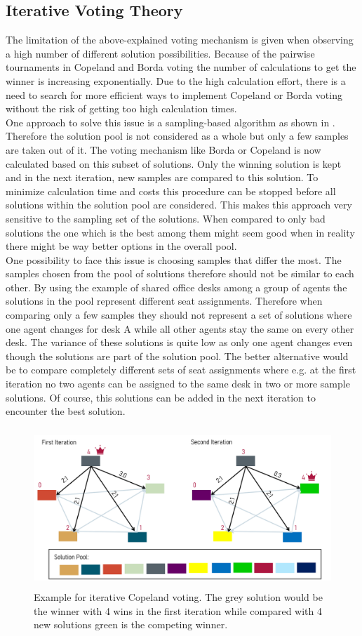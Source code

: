 \documentclass[german, a4paper, 11pt, oneside]{scrbook}
\begin{document}
\subsection{Iterative Voting Theory}
The limitation of the above-explained voting mechanism is given when observing a high number of different solution possibilities. Because of the pairwise tournaments in Copeland and Borda voting the number of calculations to get the winner is increasing exponentially. Due to the high calculation effort, there is a need to search for more efficient ways to implement Copeland or Borda voting without the risk of getting too high calculation times. \cite{Bhavnani.2022b}
\\One approach to solve this issue is a sampling-based algorithm as shown in \cite{Bhavnani.2022b}. Therefore the solution pool is not considered as a whole but only a few samples are taken out of it. The voting mechanism like Borda or Copeland is now calculated based on this subset of solutions. Only the winning solution is kept and in the next iteration, new samples are compared to this solution. To minimize calculation time and costs this procedure can be stopped before all solutions within the solution pool are considered. This makes this approach very sensitive to the sampling set of the solutions. When compared to only bad solutions the one which is the best among them might seem good when in reality there might be way better options in the overall pool. \\One possibility to face this issue is choosing samples that differ the most. The samples chosen from the pool of solutions therefore should not be similar to each other. By using the example of shared office desks among a group of agents the solutions in the pool represent different seat assignments. Therefore when comparing only a few samples they should not represent a set of solutions where one agent changes for desk A while all other agents stay the same on every other desk. The variance of these solutions is quite low as only one agent changes even though the solutions are part of the solution pool. The better alternative would be to compare completely different sets of seat assignments where e.g. at the first iteration no two agents can be assigned to the same desk in two or more sample solutions. Of course, this solutions can be added in the next iteration to encounter the best solution.
\begin{figure}[h]
\centering
\includegraphics[height=6cm]{Iterative_voting}
\caption{Example for iterative Copeland voting. The grey solution would be the winner with 4 wins in the first iteration while compared with 4 new solutions green is the competing winner.}
\end{figure}
\end{document}
